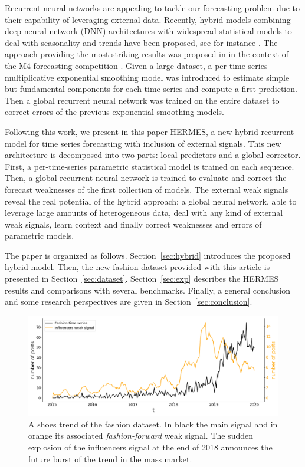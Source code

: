 \documentclass[review]{elsarticle}
\begin{document}
Recurrent neural networks are appealing to tackle our forecasting problem due to their capability of leveraging external data.  Recently, hybrid models combining deep neural network (DNN) architectures with widespread statistical models to deal with seasonality and trends have been proposed, see for instance  \cite{zhang2003,jianwei2019,bandara2020}. The approach providing the most striking results was proposed in  \cite{smyl2020} in the context of the M4 forecasting competition \cite{makridakis2020}.  Given a large dataset, a per-time-series multiplicative exponential smoothing model was introduced to estimate simple but fundamental components for each time series and compute a first prediction. Then a global recurrent neural network was trained on the entire dataset to correct errors of the previous exponential smoothing models. 

Following this work, we present in this paper HERMES, a new hybrid recurrent model for time series forecasting with inclusion of external signals. This new architecture is decomposed  into two parts: local predictors and a global corrector.  First, a per-time-series parametric statistical model is trained on each sequence. Then, a global recurrent neural network is trained to evaluate and correct the forecast weaknesses of the first collection of models. The external weak signals reveal the real potential of the hybrid approach: a global neural network, able to leverage large amounts of heterogeneous data, deal with any kind of external weak signals, learn context and finally correct weaknesses and errors of parametric models.

The paper is organized as follows. Section~\ref{sec:hybrid} introduces the proposed hybrid model. Then, the new fashion dataset provided with this article is presented in Section~\ref{sec:dataset}. Section~\ref{sec:exp} describes the HERMES results and comparisons with several benchmarks. Finally, a general conclusion and some research perspectives are given in  Section~\ref{sec:conclusion}.

\begin{figure}
  \centering
    \includegraphics[width=1.\linewidth]{br_female_shoes_262}
  \caption{A shoes trend of the fashion dataset. In black the main signal and in orange its associated \textit{fashion-forward} weak signal. The sudden explosion of the influencers signal at the end of 2018 announces the future burst of the trend in the mass market.}
\label{fig:oneemergingtrend}
\end{figure}
\end{document}
